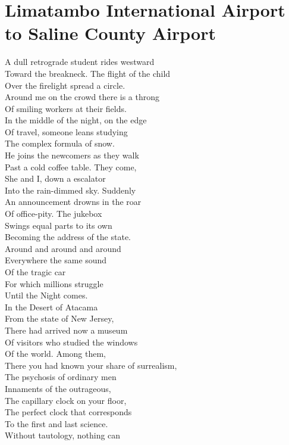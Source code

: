 \documentclass[smalldemyvopaper,11pt,twoside,onecolumn,openright,extrafontsizes]{memoir}
\begin{document}
\chapter{Limatambo International Airport to Saline County Airport}
A dull retrograde student rides westward
\\Toward the breakneck. The flight of the child
\\Over the firelight spread a circle.
\\Around me on the crowd there is a throng
\\Of smiling workers at their fields.
\\In the middle of the night, on the edge
\\Of travel, someone leans studying
\\The complex formula of snow.
\\He joins the newcomers as they walk
\\Past a cold coffee table. They come,
\\She and I, down a escalator
\\Into the rain-dimmed sky. Suddenly
\\An announcement drowns in the roar
\\Of office-pity. The jukebox
\\Swings equal parts to its own
\\Becoming the address of the state.
\\Around and around and around
\\Everywhere the same sound
\\Of the tragic car
\\For which millions struggle
\\Until the Night comes.
\\In the Desert of Atacama
\\From the state of New Jersey,
\\There had arrived now a museum
\\Of visitors who studied the windows
\\Of the world. Among them,
\\There you had known your share of surrealism,
\\The psychosis of ordinary men
\\Innaments of the outrageous,
\\The capillary clock on your floor,
\\The perfect clock that corresponds
\\To the first and last science.
\\Without tautology, nothing can
\end{document}
